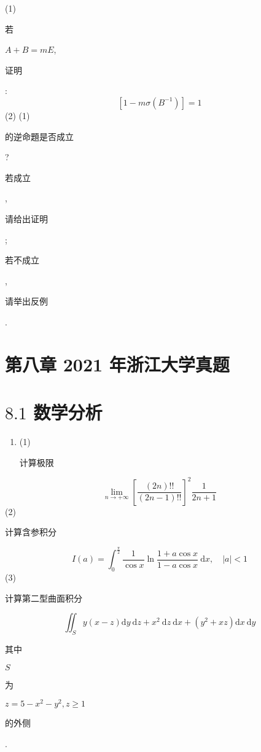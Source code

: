 \documentclass[10pt]{article}
\begin{document}
(1) \begin{CJK}{UTF8}{mj}若\end{CJK} $A+B=m E$, \begin{CJK}{UTF8}{mj}证明\end{CJK}:
$$
\left[1-m \sigma\left(B^{-1}\right)\right]=1
$$
(2) (1) \begin{CJK}{UTF8}{mj}的逆命題是否成立\end{CJK}? \begin{CJK}{UTF8}{mj}若成立\end{CJK}, \begin{CJK}{UTF8}{mj}请给出证明\end{CJK}; \begin{CJK}{UTF8}{mj}若不成立\end{CJK}, \begin{CJK}{UTF8}{mj}请举出反例\end{CJK}.

\section{第八章 2021 年浙江大学真题}
\section{$8.1$ 数学分析}
\begin{enumerate}
  \item (1) \begin{CJK}{UTF8}{mj}计算极限\end{CJK}
\end{enumerate}
$$
\lim _{n \rightarrow+\infty}\left[\frac{(2 n) ! !}{(2 n-1) ! !}\right]^{2} \frac{1}{2 n+1}
$$
(2) \begin{CJK}{UTF8}{mj}计算含参积分\end{CJK}
$$
I(a)=\int_{0}^{\frac{\pi}{2}} \frac{1}{\cos x} \ln \frac{1+a \cos x}{1-a \cos x} \mathrm{~d} x, \quad|a|<1
$$
(3) \begin{CJK}{UTF8}{mj}计算第二型曲面积分\end{CJK}
$$
\iint_{S} y(x-z) \mathrm{d} y \mathrm{~d} z+x^{2} \mathrm{~d} z \mathrm{~d} x+\left(y^{2}+x z\right) \mathrm{d} x \mathrm{~d} y
$$
\begin{CJK}{UTF8}{mj}其中\end{CJK} $S$ \begin{CJK}{UTF8}{mj}为\end{CJK} $z=5-x^{2}-y^{2}, z \geq 1$ \begin{CJK}{UTF8}{mj}的外侧\end{CJK}.
\end{document}
